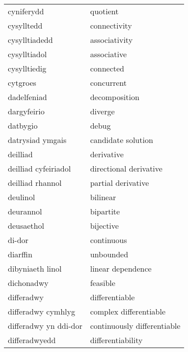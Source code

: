 \begin{supertabular}{p{0.22\textwidth}p{0.22\textwidth}}
                      cyniferydd &                          quotient \\
                      cysylltedd &                      connectivity \\
                   cysylltiadedd &                     associativity \\
                    cysylltiadol &                       associative \\
                    cysylltiedig &                         connected \\
                        cytgroes &                        concurrent \\
                     dadelfeniad &                     decomposition \\
                     dargyfeirio &                           diverge \\
                        datbygio &                             debug \\
                datrysiad ymgais &                candidate solution \\
                        deilliad &                        derivative \\
            deilliad cyfeiriadol &            directional derivative \\
                deilliad rhannol &                partial derivative \\
                        deulinol &                          bilinear \\
                       deurannol &                         bipartite \\
                      deusaethol &                         bijective \\
                          di-dor &                        continuous \\
                        diarffin &                         unbounded \\
                dibyniaeth linol &                 linear dependence \\
                      dichonadwy &                          feasible \\
                      differadwy &                    differentiable \\
              differadwy cymhlyg &            complex differentiable \\
           differadwy yn ddi-dor &       continuously differentiable \\
                   differadwyedd &                 differentiability \\

\end{supertabular}
